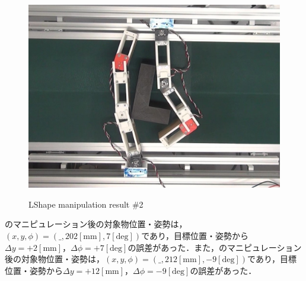 \documentclass[a4paper,twoside,12pt,papersize, dvipdfmx]{iirthesis}
\begin{document}
\begin{figure}[hbt]
\begin{minipage}{0.249\hsize}
\subcaption{}\label{}
\end{minipage}\hfill
\begin{minipage}{0.249\hsize}
\centering
\includegraphics[width=0.98\hsize]{fig/4-manipulation-result/LShape/2-4.jpg}
\subcaption{}\label{}
\end{minipage}
\caption{LShape manipulation result \#2}\label{fig::result::lm2}
\end{figure}

のマニピュレーション後の対象物位置・姿勢は，$(x, y, \phi) = (\_, 202 \mathrm{[mm]}, 7 \mathrm{[deg]})$であり，目標位置・姿勢から$\Delta y = +2 \mathrm{[mm]}$，$\Delta \phi = +7 \mathrm{[deg]}$の誤差があった．また，のマニピュレーション後の対象物位置・姿勢は，$(x, y, \phi) = (\_, 212 \mathrm{[mm]}, -9 \mathrm{[deg]})$であり，目標位置・姿勢から$\Delta y = +12 \mathrm{[mm]}$，$\Delta \phi = -9 \mathrm{[deg]}$の誤差があった．\par
\end{document}
